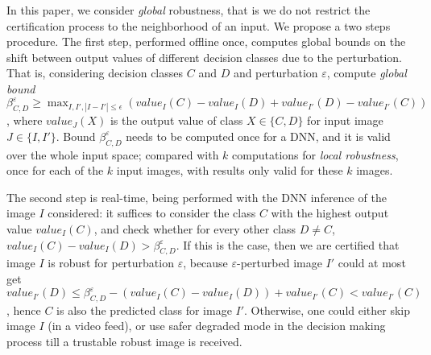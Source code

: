 In this paper, we consider {\em global} robustness, that is we do not restrict the certification process to the neighborhood of an input. We propose a two steps procedure. The first step, performed offline once, 
computes global bounds on the shift between 
output values of different decision classes due to the perturbation. That is, considering decision classes $C$ and $D$ and perturbation $\varepsilon$, compute 
{\em global bound} $\beta^\varepsilon_{C,D} \geq \max_{I,I', |I-I'| \leq \epsilon}(value_{I}(C) - value_{I}(D) + value_{I'}(D) - value_{I'}(C))$, where $value_{J}(X)$ is the output value of class $X \in \{C,D\}$ for input image $J \in \{I,I'\}$. %
Bound $\beta^\varepsilon_{C,D}$ needs to be computed once for a DNN, 
and it is valid over the whole input space; compared with $k$ computations for {\em local robustness}, once for each of the $k$ input images, with results only valid for these $k$ images.

The second step is real-time, being performed with the DNN inference of the image $I$ considered: it suffices to consider the class $C$ with the highest output value $value_{I}(C)$, and check whether for every other class $D \neq C$, 
$value_{I}(C) - value_{I}(D) > \beta^\varepsilon_{C,D}$. 
If this is the case, then we are certified that image $I$ is robust for perturbation $\varepsilon$, because $\varepsilon$-perturbed image $I'$ could at most get  $value_{I'}(D) \leq \beta^\varepsilon_{C,D}  - (value_{I}(C) - value_{I}(D))  + value_{I'}(C) < value_{I'}(C)$, hence $C$ is also the predicted class for image $I'$. Otherwise, one could either skip image $I$ (in a video feed), or use safer degraded mode in the decision making process till a trustable robust image is received.


